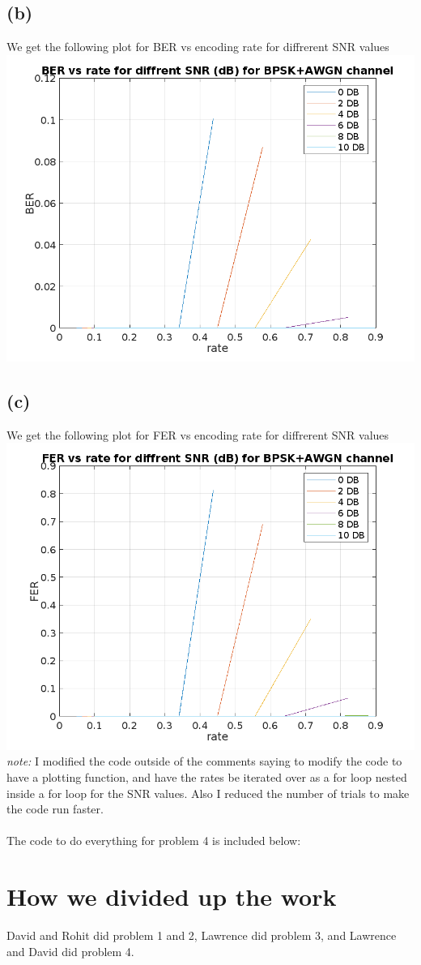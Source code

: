 \documentclass[a4paper,10pt]{article}
\begin{document}
\subsection{(b)}
We get the following plot for BER vs encoding rate for diffrerent SNR values\\
\includegraphics[scale=0.9]{code/BER vs rate for diffrent SNR (dB) for BPSK+AWGN channel.png}
\subsection{(c)}
We get the following plot for FER vs encoding rate for diffrerent SNR values\\
\includegraphics[scale=0.9]{code/FER vs rate for diffrent SNR (dB) for BPSK+AWGN channel.png}
\\\textit{note:} I modified the code outside of the comments saying to modify the code
to have a plotting function, and have the rates be iterated over as a for loop
nested inside a for loop for the SNR values. Also I reduced the number of trials
to make the code run faster. \\\\The code to do everything for
problem 4 is included below:

\section{How we divided up the work}
David and Rohit did problem 1 and 2, Lawrence did problem 3, and Lawrence 
and David did problem 4.
\end{document}
